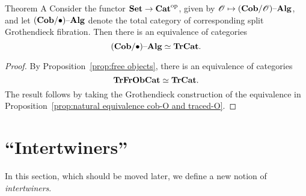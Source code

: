 \documentclass[12pt,oneside,article,draft]{memoir}
\begin{document}
%
%
%
\begin{named}{Theorem A}\label{thm:Theorem A}
	Consider the functor $\mathbf{Set}\to{\mathbf{Cat}}^{\text{op}}$, given by $\mathscr{O}\mapsto(\mathbf{Cob}/\mathscr{O}){\text \textendash}\mathbf{Alg}$, and let $(\mathbf{Cob}/\bullet){\text \textendash}\mathbf{Alg}$ denote the total category of corresponding split Grothendieck fibration.
	Then there is an equivalence of categories
		$$(\mathbf{Cob}/\bullet){\text \textendash}\mathbf{Alg}\simeq\mathbf{TrCat}.$$
\end{named}
\begin{proof}
	By Proposition~\ref{prop:free objects}, there is an equivalence of categories
		$$\mathbf{TrFrObCat}\simeq\mathbf{TrCat}.$$
	The result follows by taking the Grothendieck construction of the equivalence in Proposition~\ref{prop:natural equivalence cob-O and traced-O}.
\end{proof}


\chapter{``Intertwiners''}

In this section, which should be moved later, we define a new notion of \emph{intertwiners}.
\end{document}

